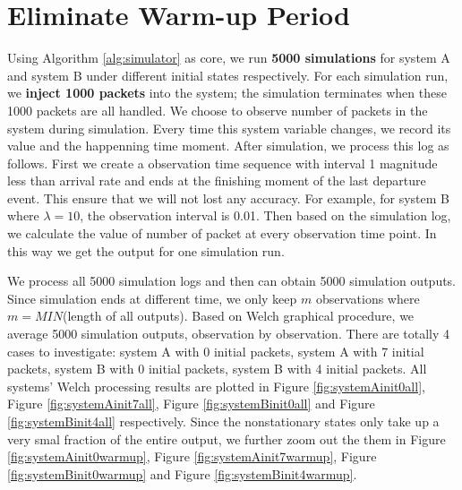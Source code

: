 \documentclass[12pt]{article}  %
\theoremstyle{definition}
\theoremstyle{remark}
\begin{document}
\section{Eliminate Warm-up Period}
Using Algorithm \ref{alg:simulator} as core, we run \textbf{5000 simulations} for system A and system B under different initial states respectively.
For each simulation run, we \textbf{inject 1000 packets} into the system; the simulation terminates when these 1000 packets are all handled.
We choose to observe number of packets in the system during simulation.
Every time this system variable changes, we record its value and the happenning time moment.
After simulation, we process this log as follows.
First we create a observation time sequence with interval 1 magnitude less than arrival rate and ends at the finishing moment of the last departure event.
This ensure that we will not lost any accuracy.
For example, for system B where $\lambda=10$, the observation interval is 0.01.
Then based on the simulation log, we calculate the value of number of packet at every observation time point.
In this way we get the output for one simulation run.

We process all 5000 simulation logs and then can obtain 5000 simulation outputs.
Since simulation ends at different time, we only keep $m$ observations where $m = MIN$(length of all outputs).
Based on Welch graphical procedure, we average 5000 simulation outputs, observation by observation.
There are totally 4 cases to investigate: system A with 0 initial packets, system A with 7 initial packets, system B with 0 initial packets, system B with 4 initial packets.
All systems' Welch processing results are plotted in Figure \ref{fig:systemAinit0all}, Figure \ref{fig:systemAinit7all}, Figure \ref{fig:systemBinit0all} and Figure \ref{fig:systemBinit4all} respectively.
Since the nonstationary states only take up a very smal fraction of the entire output, we further zoom out the them in Figure \ref{fig:systemAinit0warmup}, Figure \ref{fig:systemAinit7warmup}, Figure \ref{fig:systemBinit0warmup} and Figure \ref{fig:systemBinit4warmup}.
\end{document}
